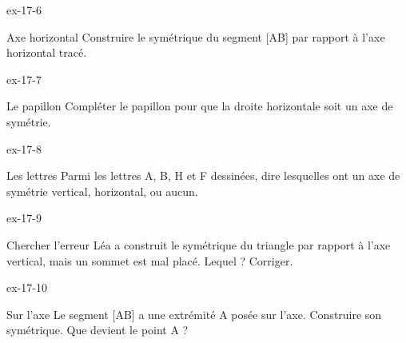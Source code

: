 \begin{blocLivre}{ex-17-6}\begin{exercice}[2]{Axe horizontal}
Construire le symétrique du segment [AB] par rapport à l’axe horizontal tracé.
\label{fig-ex-17-6}
\end{exercice}\end{blocLivre}
\begin{blocLivre}{ex-17-7}\begin{exercice}[2]{Le papillon}
Compléter le papillon pour que la droite horizontale soit un axe de symétrie.
\label{fig-ex-17-7}
\end{exercice}\end{blocLivre}
\begin{blocLivre}{ex-17-8}\begin{exercice}[2]{Les lettres}
Parmi les lettres A, B, H et F dessinées, dire lesquelles ont un axe de symétrie vertical, horizontal, ou aucun.
\label{fig-ex-17-8}
\end{exercice}\end{blocLivre}
\begin{blocLivre}{ex-17-9}\begin{exercice}[2]{Chercher l’erreur}
Léa a construit le symétrique du triangle par rapport à l’axe vertical, mais un sommet est mal placé. Lequel ? Corriger.
\label{fig-ex-17-9}
\end{exercice}\end{blocLivre}
\begin{blocLivre}{ex-17-10}\begin{exercice}[2]{Sur l’axe}
Le segment [AB] a une extrémité A posée sur l’axe. Construire son symétrique. Que devient le point A ?
\label{fig-ex-17-10}
\end{exercice}\end{blocLivre}

